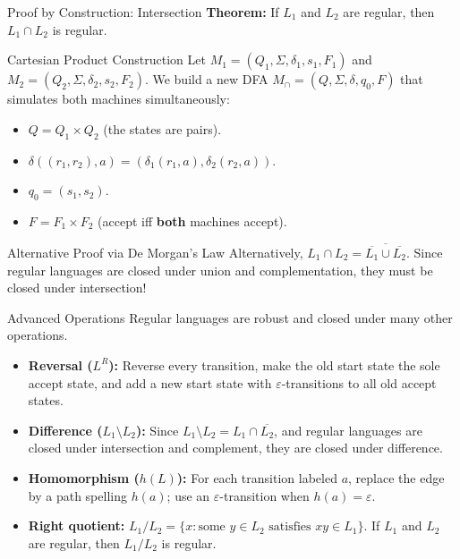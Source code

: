 \documentclass[10pt]{beamer}
\begin{document}
\begin{frame}{Proof by Construction: Intersection}
  \textbf{Theorem:} If $L_1$ and $L_2$ are regular, then $L_1 \cap L_2$ is regular.
  \pause
  
  \begin{block}{Cartesian Product Construction}
    Let $M_1=(Q_1,\Sigma,\delta_1,s_1,F_1)$ and
    $M_2=(Q_2,\Sigma,\delta_2,s_2,F_2)$.
    We build a new DFA $M_{\cap} = (Q, \Sigma, \delta, q_0, F)$ that simulates both machines simultaneously:
    \begin{itemize}
        \item $Q = Q_1 \times Q_2$ (the states are pairs).
        \item $\delta((r_1, r_2), a) = (\delta_1(r_1, a), \delta_2(r_2, a))$.
        \item $q_0 = (s_1, s_2)$.
        \item $F = F_1 \times F_2$ (accept iff \textbf{both} machines accept).
    \end{itemize}
  \end{block}
  \pause
  \begin{alertblock}{Alternative Proof via De Morgan's Law}
    Alternatively, $L_1 \cap L_2 = \overline{\overline{L_1} \cup \overline{L_2}}$. Since regular languages are closed under union and complementation, they must be closed under intersection!
  \end{alertblock}
\end{frame}

\begin{frame}{Advanced Operations}
  \small
  Regular languages are robust and closed under many other operations.
  \pause
  \begin{itemize}
      \item \textbf{Reversal ($L^R$):} Reverse every transition, make the old
        start state the sole accept state, and add a new start state with
        $\varepsilon$-transitions to all old accept states.
      \pause
      \item \textbf{Difference ($L_1 \setminus L_2$):} Since $L_1 \setminus L_2 = L_1 \cap \overline{L_2}$, and regular languages are closed under intersection and complement, they are closed under difference.
      \pause
      \item \textbf{Homomorphism ($h(L)$):} For each transition labeled $a$,
        replace the edge by a path spelling $h(a)$; use an
        $\varepsilon$-transition when $h(a)=\varepsilon$.
      \pause
      \item \textbf{Right quotient:}
        $L_1/L_2=\{x:\text{some }y\in L_2\text{ satisfies }xy\in L_1\}$.
        If $L_1$ and $L_2$ are regular, then $L_1/L_2$ is regular.
  \end{itemize}
\end{frame}
\end{document}
